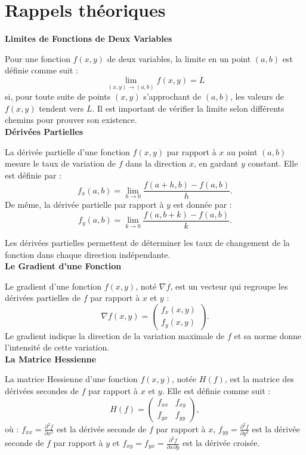 
\section*{Rappels théoriques}

\textbf{Limites de Fonctions de Deux Variables}

Pour une fonction \( f(x, y) \) de deux variables, la limite en un point \((a, b)\) est définie comme suit :
\[
\lim_{(x, y) \to (a, b)} f(x, y) = L
\]
si, pour toute suite de points \((x, y)\) s'approchant de \((a, b)\), les valeurs de \( f(x, y) \) tendent vers \( L \). Il est important de vérifier la limite selon différents chemins pour prouver son existence. \\

\textbf{Dérivées Partielles}

La dérivée partielle d'une fonction \( f(x, y) \) par rapport à \( x \) au point \((a, b)\) mesure le taux de variation de \( f \) dans la direction \( x \), en gardant \( y \) constant. Elle est définie par :
\[
f_x(a, b) = \lim_{h \to 0} \frac{f(a + h, b) - f(a, b)}{h}.
\]
De même, la dérivée partielle par rapport à \( y \) est donnée par :
\[
f_y(a, b) = \lim_{k \to 0} \frac{f(a, b + k) - f(a, b)}{k}.
\]

Les dérivées partielles permettent de déterminer les taux de changement de la fonction dans chaque direction indépendante. \\

\textbf{Le Gradient d'une Fonction}

Le gradient d'une fonction \( f(x, y) \), noté \( \nabla f \), est un vecteur qui regroupe les dérivées partielles de \( f \) par rapport à \( x \) et \( y \) :
\[
\nabla f(x, y) = \begin{pmatrix} f_x(x, y) \\ f_y(x, y) \end{pmatrix}.
\]
Le gradient indique la direction de la variation maximale de \( f \) et sa norme donne l'intensité de cette variation. \\

\textbf{La Matrice Hessienne}

La matrice Hessienne d'une fonction \( f(x, y) \), notée \( H(f) \), est la matrice des dérivées secondes de \( f \) par rapport à \( x \) et \( y \). Elle est définie comme suit :
\[
H(f) = \begin{pmatrix} f_{xx} & f_{xy} \\ f_{yx} & f_{yy} \end{pmatrix},
\]
où : \( f_{xx} = \frac{\partial^2 f}{\partial x^2} \) est la dérivée seconde de \( f \) par rapport à \( x \), \( f_{yy} = \frac{\partial^2 f}{\partial y^2} \) est la dérivée seconde de \( f \) par rapport à \( y \) et \( f_{xy} = f_{yx} = \frac{\partial^2 f}{\partial x \partial y} \) est la dérivée croisée.

